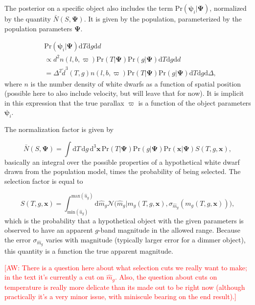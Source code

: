 \documentclass[fleqn,usenatbib]{mnras}
\newcommand{\aw}[1]{\textcolor{red}{[AW: #1]}}
\newcommand{\popp}{\boldsymbol{\Psi}}
\newcommand{\objp}{\boldsymbol{\psi}}
\newcommand{\Teff}{T}
\newcommand{\logg}{g}
\newcommand{\pr}{\text{Pr}}
\newcommand{\de}{\text{d}}
\begin{document}
The posterior on a specific object also includes the term $\pr(\objp_i | \popp)$, normalized by the quantity $\bar{N}(S,\popp)$. It is given by the population, parameterized by the population parameters $\popp$.

\begin{equation}
\begin{split}
	& \pr(\objp_i | \popp) \de \Teff \de \logg \de d  \\ & \propto
    d^2 n(l,b,\varpi) \pr(\Teff | \popp) \pr(g | \popp) \de \Teff \de \logg \de d \\
    & = \Delta^2\tilde{d}^3(\Teff,\logg) n(l,b,\varpi) \pr(\Teff | \popp) \pr(g | \popp) \de \Teff \de \logg \de \Delta,
\end{split}
\end{equation}
where $n$ is the number density of white dwarfs as a function of spatial position (possible here to also include velocity, but will leave that for now). It is implicit in this expression that the true parallax $\varpi$ is a function of the object parameters $\objp_i$.

The normalization factor is given by

\begin{equation}
	\bar{N}(S,\popp) = \int \de\Teff\, \de \logg\, \de^3\mathbf{x}\,
    \pr(\Teff | \popp) \pr(\logg | \popp) \pr(\mathbf{x} | \popp) S(\Teff,\logg,\mathbf{x}),
\end{equation}
basically an integral over the possible properties of a hypothetical white dwarf drawn from the population model, times the probability of being selected. The selection factor is equal to

\begin{equation}
	S(\Teff,\logg,\mathbf{x}) =
    \int_{\text{min}(\hat{u}_g)}^{\text{max}(\hat{u}_g)} \de \hat{m}_g \mathcal{N}\big( \hat{m}_g | m_g(\Teff,\logg,\mathbf{x}),\sigma_{\hat{m}_g}(m_g(\Teff,\logg,\mathbf{x})) \big),
\end{equation}
which is the probability that a hypothetical object with the given parameters is observed to have an apparent $g$-band magnitude in the allowed range. Because the error $\sigma_{\hat{m}_g}$ varies with magnitude (typically larger error for a dimmer object), this quantity is a function the true apparent magnitude.

\aw{There is a question here about what selection cuts we really want to make; in the text it's currently a cut on $\hat{m}_g$. Also, the question about cuts on temperature is really more delicate than its made out to be right now (although practically it's a very minor issue, with miniscule bearing on the end result).}
\end{document}
